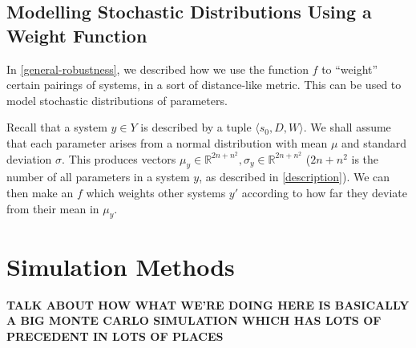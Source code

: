 \documentclass{article}
\begin{document}
\subsection{Modelling Stochastic Distributions Using a Weight Function}
In \ref{general-robustness}, we described how we use the function $f$ to ``weight'' certain pairings of systems, in a sort of distance-like metric. This can be used to model stochastic distributions of parameters.

Recall that a system $y \in Y$ is described by a tuple $\langle s_0, D, W \rangle$. We shall assume that each parameter arises from a normal distribution with mean $\mu$ and standard deviation $\sigma$. This produces vectors $\mu_y \in \mathbb{R}^{2n + n^2}, \sigma_y \in \mathbb{R}^{2n + n^2}$ ($2n + n^2$ is the number of all parameters in a system $y$, as described in \ref{description}). We can then make an $f$ which weights other systems $y'$ according to how far they deviate from their mean in $\mu_y$.

\section{Simulation Methods}
\textbf{TALK ABOUT HOW WHAT WE'RE DOING HERE IS BASICALLY A BIG MONTE CARLO SIMULATION WHICH HAS LOTS OF PRECEDENT IN LOTS OF PLACES}
\end{document}
